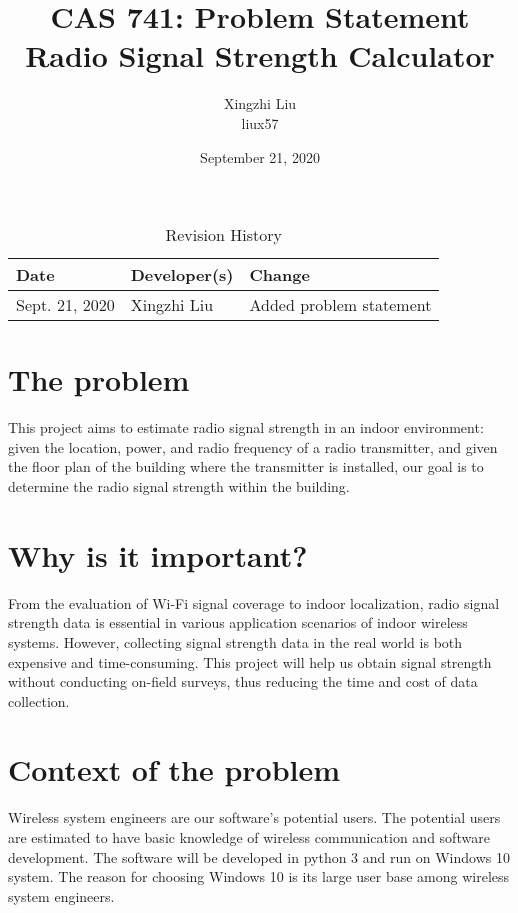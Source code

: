 \documentclass{article}
\title{CAS 741: Problem Statement\\Radio Signal Strength Calculator}
\author{Xingzhi Liu\\liux57}
\date{September 21, 2020}
\begin{document}
\maketitle

\begin{table}[hp]
\caption{Revision History} \label{TblRevisionHistory}
\begin{tabularx}{\textwidth}{llX}
\toprule
\textbf{Date} & \textbf{Developer(s)} & \textbf{Change}\\
\midrule
Sept. 21, 2020 & Xingzhi Liu & Added problem statement\\
\bottomrule
\end{tabularx}
\end{table}

\section{The problem} This project aims to estimate radio signal strength 
in an indoor environment: given the location, power, and radio frequency 
of a radio transmitter, and given the floor plan of the building where the 
transmitter is installed, our goal is to determine the radio signal strength 
within the building. 

\section{Why is it important?} 
From the evaluation of Wi-Fi signal coverage to indoor localization, radio 
signal strength data is essential in various application scenarios of indoor 
wireless systems. However, collecting signal strength data in the real world 
is both expensive and time-consuming. This project will help us obtain signal 
strength without conducting on-field surveys, thus reducing the time and cost 
of data collection.

\section{Context of the problem}
Wireless system engineers are our software's potential users. The potential 
users are estimated to have basic knowledge of wireless communication and 
software development. The software will be developed in python 3 and run on 
Windows 10 system. The reason for choosing Windows 10 is its large user base 
among wireless system engineers.
\end{document}
